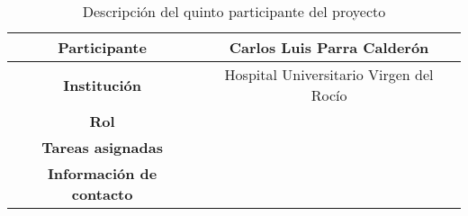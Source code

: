 \begin{table}[H]
    \centering
    \begin{tabular}{|c|c|}
    \hline
    \textbf{Participante} & Carlos Luis Parra Calderón \\
    \hline
    \textbf{Institución} & Hospital Universitario Virgen del Rocío \\
    \hline
    \textbf{Rol} &  \\
    \hline
    \textbf{Tareas asignadas} & \\
    \hline
    \textbf{Información de contacto} & \\
    \hline
    \end{tabular}
\caption{Descripción del quinto participante del proyecto}
\label{tab:quintoParticipante}
\end{table}